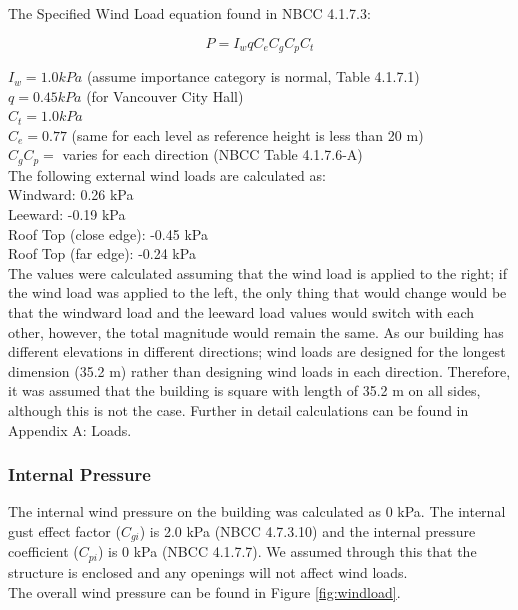 \documentclass[12pt]{article}
\begin{document}
The Specified Wind Load equation found in NBCC 4.1.7.3:

\begin{equation*}
    P=I_{w}qC_{e}C_{g}C_{p}C_{t}
\end{equation*}

$I_{w}= 1.0 kPa$ (assume importance category is normal, Table 4.1.7.1)\\
$q= 0.45 kPa$ (for Vancouver City Hall)\\
$C_{t}= 1.0 kPa$\\
$C_{e}= 0.77$ (same for each level as reference height is less than 20 m)\\
$C_{g}C_{p}=$ varies for each direction (NBCC Table 4.1.7.6-A)\\

The following external wind loads are calculated as:\\
Windward: 0.26 kPa\\
Leeward: -0.19 kPa\\
Roof Top (close edge): -0.45 kPa\\
Roof Top (far edge): -0.24 kPa\\

The values were calculated assuming that the wind load is applied to the right; if the wind load was applied to the left, the only thing that would change would be that the windward load and the leeward load values would switch with each other, however, the total magnitude would remain the same. As our building has different elevations in different directions; wind loads are designed for the longest dimension (35.2 m) rather than designing wind loads in each direction. Therefore, it was assumed that the building is square with length of 35.2 m on all sides, although this is not the case. Further in detail calculations can be found in Appendix A: Loads.
\subsubsection{Internal Pressure}
The internal wind pressure on the building was calculated as 0 kPa. The internal gust effect factor ($C_{gi}$) is 2.0 kPa (NBCC 4.7.3.10) and the internal pressure coefficient ($C_{pi}$) is 0 kPa (NBCC 4.1.7.7). We assumed through this that the structure is enclosed and any openings will not affect wind loads.\\

The overall wind pressure can be found in Figure \ref{fig:windload}.
\end{document}
